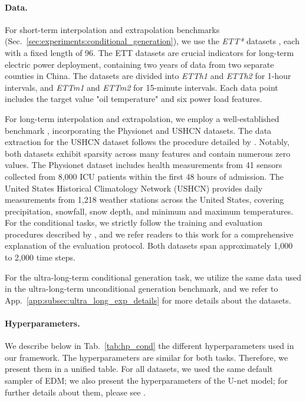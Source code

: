 \documentclass{article}
\begin{document}
\paragraph{Data.} For short-term interpolation and extrapolation benchmarks (Sec.~\ref{sec:experiments:conditional_generation}), we use the \textit{ETT*} datasets \cite{zhou2021informer}, each with a fixed length of 96. The ETT datasets are crucial indicators for long-term electric power deployment, containing two years of data from two separate counties in China. The datasets are divided into \textit{ETTh1} and \textit{ETTh2} for 1-hour intervals, and \textit{ETTm1} and \textit{ETTm2} for 15-minute intervals. Each data point includes the target value "oil temperature" and six power load features.

For long-term interpolation and extrapolation, we employ a well-established benchmark \cite{rubanova2019latent, schirmer2022modeling, zhou2023deep}, incorporating the Physionet and USHCN datasets. The data extraction for the USHCN dataset follows the procedure detailed by \cite{de2019gru}. Notably, both datasets exhibit sparsity across many features and contain numerous zero values. The Physionet dataset \cite{silva2012predicting} includes health measurements from 41 sensors collected from 8,000 ICU patients within the first 48 hours of admission. The United States Historical Climatology Network (USHCN) \cite{menne2015long} provides daily measurements from 1,218 weather stations across the United States, covering precipitation, snowfall, snow depth, and minimum and maximum temperatures. For the conditional tasks, we strictly follow the training and evaluation procedures described by \cite{schirmer2022modeling}, and we refer readers to this work for a comprehensive explanation of the evaluation protocol. Both datasets span approximately 1,000 to 2,000 time steps.

For the ultra-long-term conditional generation task, we utilize the same data used in the ultra-long-term unconditional generation benchmark, and we refer to App.~\ref{app:subsec:ultra_long_exp_details} for more details about the datasets.

\paragraph{Hyperparameters.} We describe below in Tab.~\ref{tab:hp_cond} the different hyperparameters used in our framework. The hyperparameters are similar for both tasks. Therefore, we present them in a unified table. For all datasets, we used the same default sampler of EDM\cite{karras2022elucidating}; we also present the hyperparameters of the U-net model; for further details about them, please see \cite{karras2022elucidating}.
\end{document}
